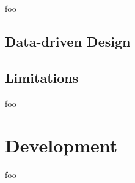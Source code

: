 \documentclass[12pt, a4paper]{article}
\begin{document}

foo


\subsection{Data-driven Design}


\subsection{Limitations}


foo

\pagebreak


\section{Development}




foo

\end{document}
